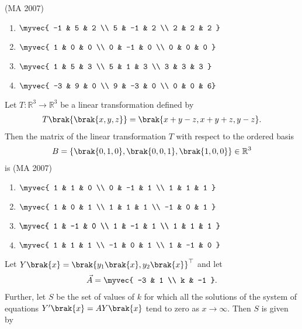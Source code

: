 \hfill{(MA 2007)}
\begin{multicols}{4}
\begin{enumerate}    
        \item $\myvec{ -1 & 5 & 2 \\ 5 & -1 & 2 \\ 2 & 2 & 2 }$
        \item $\myvec{ 1 & 0 & 0 \\ 0 & -1 & 0 \\ 0 & 0 & 0 }$
        \item $\myvec{ 1 & 5 & 3 \\ 5 & 1 & 3 \\ 3 & 3 & 3 }$
        \item $\myvec{ -3 & 9 & 0 \\ 9 & -3 & 0 \\ 0 & 0 & 6}$ 
    \end{enumerate}
    \end{multicols}
\item Let $T:\mathbb{R}^3 \rightarrow \mathbb{R}^3$ be a linear transformation defined by
\begin{align*}
T\brak{\brak{x, y, z}} = \brak{x + y - z, x + y + z, y - z}.
\end{align*}
Then the matrix of the linear transformation $T$ with respect to the ordered basis
\begin{align*}
    B = \{\brak{0,1,0}, \brak{0,0,1}, \brak{1,0,0}\} \in \mathbb{R}^3
\end{align*}
is \hfill{(MA 2007)}
\begin{multicols}{2}
\begin{enumerate}    
        \item $\myvec{ 1 & 1 & 0 \\ 0 & -1 & 1 \\ 1 & 1 & 1 }$
        \item $\myvec{ 1 & 0 & 1 \\ 1 & 1 & 1 \\ -1 & 0 & 1 }$
        \item $\myvec{ 1 & -1 & 0 \\ 1 & -1 & 1 \\ 1 & 1 & 1  }$
        \item $\myvec{ 1 & 1 & 1 \\ -1 & 0 & 1 \\ 1 & -1 & 0 }$ 
    \end{enumerate}
\end{multicols}
\item Let $Y\brak{x} = \brak{y_1\brak{x}, y_2\brak{x}}^\top$ and let
\begin{align*}
\vec{A} = \myvec{ -3 & 1 \\ k & -1 }.
\end{align*}
Further, let $S$ be the set of values of $k$ for which all the solutions of the system of equations $Y'\brak{x} = A Y\brak{x}$ tend to zero as $x \rightarrow \infty$. 
Then $S$ is given by      

